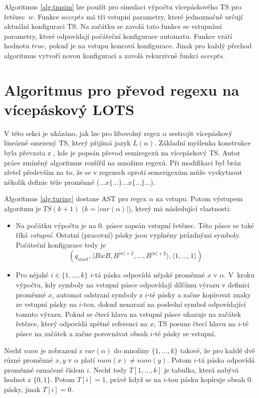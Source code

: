 \documentclass[thesis=B,czech]{FITthesis}[2019/12/23]
\theoremstyle{definition}
\begin{document}
Algoritmus \ref{alg:tmsim} lze použít pro simulaci výpočtu vícepáskového TS pro řetězec~$w$. Funkce $accepts$ má tři vstupní parametry, které jednoznačně určují aktuální konfiguraci TS. Na začátku se zavolá tato funkce se vstupními parametry, které odpovídají počáteční konfigurace automatu. Funkce vrátí hodnotu $true$, pokud je na vstupu koncová konfigurace. Jinak pro každý přechod algoritmus vytvoří novou konfiguraci a zavolá rekurzivně funkci $accepts$. 

\section{Algoritmus pro převod regexu na vícepáskový LOTS}\label{sec:turing}
V této sekci je ukázáno, jak lze pro libovolný regex $\alpha$ sestrojit vícepáskový lineárně omezený TS, který přijímá jazyk $L\left(\alpha\right)$.
Základní myšlenka konstrukce byla převzata z \cite[s. 8]{campeanu}, kde je popsán převod semiregexů na vícepáskový TS. Autor práce zmíněný algoritmus rozšířil na množinu regexů. Při modifikaci byl brán zřetel především na to, že se v regexech oproti semerigexům může vyskytnout několik definic téže proměnné ($\dots x\{\dots\}\dots x\{\dots\}\dots$).

Algoritmus \ref{alg:turing} dostane AST pro regex $\alpha$ na vstupu. 
Potom výstupem algoritmu je $TS(k+1)$ ($k=|var(\alpha)|$), který má následující vlastnosti:
\begin{itemize}
	\item{Na počátku výpočtu je na 0. pásce zapsán vstupní řetězec. Této pásce se také říká \emph{vstupní}. Ostatní (pracovní) pásky jsou vyplněny prázdnými symboly. Počáteční konfigurace tedy je $$\left(q_{start}, \langle BwB, B^{|w|+2}, \dots, B^{|w|+2} \rangle,  \langle 1, \dots, 1\rangle\right)$$}
	\item{Pro nějaké $i \in \{1, \dots, k\}$ $i$-tá páska odpovídá nějaké proměnné $x$ v $\alpha$. V~kroku výpočtu, kdy symboly na vstupní pásce odpovídají dílčímu výrazu v definici proměnné $x$, automat odstraní symboly z $i$-té pásky a začne kopírovat znaky ze vstupní pásky na $i$-tou, dokud nenarazí na poslední symbol odpovídající tomuto výrazu. Pokud se čtecí hlava na vstupní pásce ukazuje na začátek řetězce, který odpovídá zpětné referenci na $x$, TS posune čtecí hlavu na $i$-té pásce na začátek a začne porovnávat obsah $i$-té pásky se vstupní.}
\end{itemize} 

Nechť $num$ je zobrazení z $var(\alpha)$ do množiny $\{1, \dots, k\}$ takové, že pro každé dvě různé proměnné $x, y$ v $\alpha$ platí $num(x) \ne num(y)$. Potom $i$-tá páska odpovídá proměnné označené číslem $i$. Nechť tedy $T[1, \dots, k]$ je tabulka, která nabývá hodnot z $\{0,1\}$. Potom $T[i] = 1$, právě když se na $i$-tou pásku kopíruje obsah 0. pásky, jinak $T[i] = 0$. 
\end{document}
